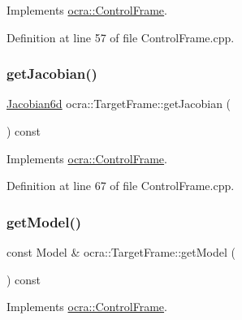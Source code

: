 Implements \hyperlink{classocra_1_1ControlFrame_a0ceb7cd7c3fe90fa0ef311b96a6f5c88}{ocra\+::\+Control\+Frame}.



Definition at line 57 of file Control\+Frame.\+cpp.

\hypertarget{classocra_1_1TargetFrame_a94d2746633b7112afae754370a3a3e1f}{}\label{classocra_1_1TargetFrame_a94d2746633b7112afae754370a3a3e1f} 
\subsubsection{\texorpdfstring{get\+Jacobian()}{getJacobian()}}
{\footnotesize\ttfamily \hyperlink{namespaceocra_ac73b015f9f7cb0c252c4d5c4800f559a}{Jacobian6d} ocra\+::\+Target\+Frame\+::get\+Jacobian (\begin{DoxyParamCaption}{ }\end{DoxyParamCaption}) const\hspace{0.3cm}{\ttfamily [virtual]}}



Implements \hyperlink{classocra_1_1ControlFrame_a14e0b855979be5dbd360314f25191e77}{ocra\+::\+Control\+Frame}.



Definition at line 67 of file Control\+Frame.\+cpp.

\hypertarget{classocra_1_1TargetFrame_acfd238567f0cfb9e6107cd17103ec6ea}{}\label{classocra_1_1TargetFrame_acfd238567f0cfb9e6107cd17103ec6ea} 
\subsubsection{\texorpdfstring{get\+Model()}{getModel()}}
{\footnotesize\ttfamily const Model \& ocra\+::\+Target\+Frame\+::get\+Model (\begin{DoxyParamCaption}{ }\end{DoxyParamCaption}) const\hspace{0.3cm}{\ttfamily [virtual]}}



Implements \hyperlink{classocra_1_1ControlFrame_ab8a1e5e3d96d7524112b4c88bf0bc5ee}{ocra\+::\+Control\+Frame}.



